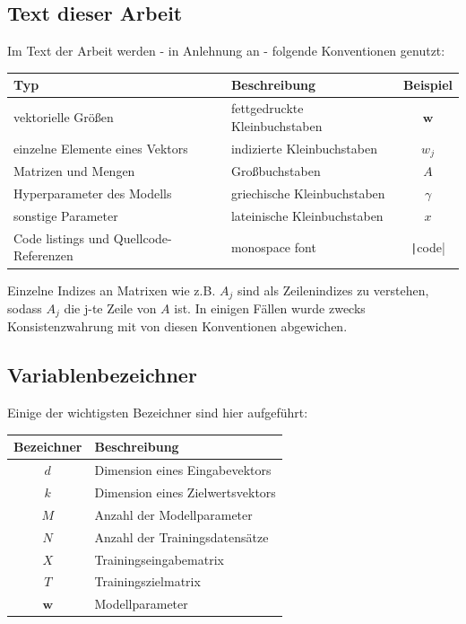 \documentclass{article}
\theoremstyle{plain} %
\theoremstyle{definition} %
\begin{document}
\subsection{Text dieser Arbeit}
Im Text der Arbeit werden - in Anlehnung an \cite{Bishop} - folgende Konventionen genutzt:

\begin{tabular}{llc}
  \toprule
  Typ & Beschreibung & Beispiel \\
  \midrule
  vektorielle Größen & fettgedruckte Kleinbuchstaben & $\mathbf{w}$ \\
  einzelne Elemente eines Vektors & indizierte Kleinbuchstaben & $w_j$ \\
  Matrizen und Mengen & Großbuchstaben & $A$ \\
  Hyperparameter des Modells & griechische Kleinbuchstaben & $\gamma$ \\
  sonstige Parameter & lateinische Kleinbuchstaben & $x$ \\
  Code listings und Quellcode-Referenzen & monospace font & \texttt|code| \\
\end{tabular}

Einzelne Indizes an Matrixen wie z.B. $A_j$ sind als Zeilenindizes zu verstehen, sodass $A_j$ die j-te Zeile von $A$ ist.
In einigen Fällen wurde zwecks Konsistenzwahrung mit \cite{Bishop} von diesen Konventionen abgewichen.

\subsection{Variablenbezeichner}

Einige der wichtigsten Bezeichner sind hier aufgeführt:

\begin{tabular}{cl}
  \toprule
  Bezeichner & Beschreibung\\
  \midrule
  $d$ & Dimension eines Eingabevektors\\
  $k$ & Dimension eines Zielwertsvektors\\
  $M$ & Anzahl der Modellparameter\\
  $N$ & Anzahl der Trainingsdatensätze\\
  $X$ & Trainingseingabematrix\\
  $T$ & Trainingszielmatrix\\
  $\mathbf{w}$ & Modellparameter\\
\end{tabular}
\end{document}
